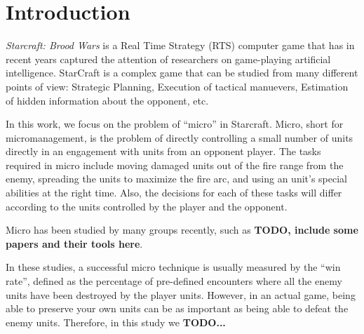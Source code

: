 \section{Introduction}\label{section:introduction}

\emph{Starcraft: Brood Wars} is a Real Time Strategy (RTS) computer
game that has in recent years captured the attention of researchers on
game-playing artificial intelligence. StarCraft is a complex game that
can be studied from many different points of view: Strategic Planning,
Execution of tactical manuevers, Estimation of hidden information
about the opponent, etc.

In this work, we focus on the problem of ``micro'' in
Starcraft. Micro, short for micromanagement, is the problem of
directly controlling a small number of units directly in an engagement
with units from an opponent player. The tasks required in micro
include moving damaged units out of the fire range from the enemy,
spreading the units to maximize the fire arc, and using an unit's
special abilities at the right time. Also, the decisions for each of
these tasks will differ according to the units controlled by the
player and the opponent.

Micro has been studied by many groups recently, such as {\bf TODO,
  include some papers and their tools here}.

In these studies, a successful micro technique is usually measured by
the ``win rate'', defined as the percentage of pre-defined encounters
where all the enemy units have been destroyed by the player
units. However, in an actual game, being able to preserve your own
units can be as important as being able to defeat the enemy
units. Therefore, in this study we {\bf TODO...}


